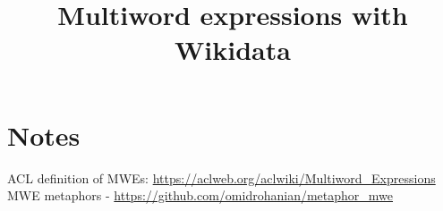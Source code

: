 \documentclass[11pt]{article}
\title{Multiword expressions with Wikidata}
\date{}
\begin{document}
\maketitle
\section{Notes}

ACL definition of MWEs: 
\url{https://aclweb.org/aclwiki/Multiword_Expressions}\\

\cite{rohanian-etal-2020-verbal} MWE metaphors - 
\url{https://github.com/omidrohanian/metaphor_mwe}


\end{document}
